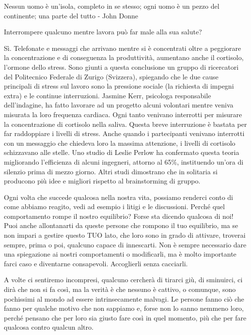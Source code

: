 \documentclass[12pt]{book} %
\begin{document}
Nessun uomo è un'isola, completo in se stesso; ogni uomo è un pezzo del continente; una parte del tutto - John Donne 

\begin{mdframed}[linewidth=1pt]
Interrompere qualcuno mentre lavora può far male alla sua salute?

Sì. Telefonate e messaggi che arrivano mentre si è concentrati oltre a peggiorare la concentrazione e di conseguenza la
produttività, aumentano anche il cortisolo, l'ormone dello stress. Sono giunti a questa conclusione un gruppo di
ricercatori del Politecnico Federale di Zurigo (Svizzera), spiegando che le due cause principali di stress sul lavoro
sono la pressione sociale (la richiesta di impegni extra) e le continue interruzioni. Jasmine Kerr, psicologa
responsabile dell'indagine, ha fatto lavorare ad un progetto alcuni volontari mentre veniva misurata la loro frequenza
cardiaca. Ogni tanto venivano interrotti per misurare la concentrazione di cortisolo nella saliva. Questa breve
interruzione è bastata per far raddoppiare i livelli di stress. Anche quando i partecipanti venivano interrotti con un
messaggio che chiedeva loro la massima attenzione, i livelli di cortisolo schizzavano alle stelle. Uno studio di Leslie
Perlow ha confermato questa teoria migliorando l'efficienza di alcuni ingegneri, attorno al 65\%, instituendo
un'ora di silenzio prima di mezzo giorno. Altri studi dimostrano che in solitaria si producono più
idee e migliori rispetto al brainstorming di gruppo.
\end{mdframed}

Ogni volta che succede qualcosa nella nostra vita, possiamo
renderci conto di come abbiamo reagito, vedi ad esempio i litigi e le discussioni. Perché quel comportamento rompe il
nostro equilibrio? Forse sta dicendo qualcosa di noi! Puoi anche allontanarti da queste persone che rompono il tuo
equilibrio, ma se non impari a gestire questo TUO lato, che loro sono in grado di attivare,
troverai sempre, prima o poi, qualcuno capace di innescarti. Non è sempre necessario dare una spiegazione ai nostri
comportamenti o modificarli, ma è molto importante farci caso e diventarne consapevoli. Accoglierli senza cacciarli.

A volte ci sentiremo incompresi, qualcuno cercherà di tirarci giù, di sminuirci, ci dirà che non si fa così, ma la
verità è che nessuno è cattivo, o comunque, sono pochissimi al mondo ad essere intrinsecamente malvagi. Le persone
fanno ciò che fanno per qualche motivo che non sappiamo e, forse non lo sanno nemmeno loro, perché pensano che per loro
sia giusto fare così in quel momento, più che per fare qualcosa contro qualcun altro.
\end{document}

